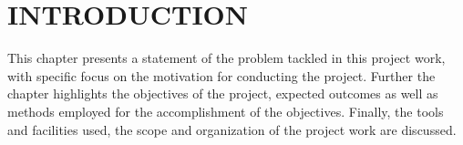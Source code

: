 

\chapter{INTRODUCTION}

\ifpdf
    \graphicspath{{1_introduction/figures/PNG/}{1_introduction/figures/PDF/}{1_introduction/figures/}}
\else
    \graphicspath{{1_introduction/figures/EPS/}{1_introduction/figures/}}
\fi




This chapter presents a statement of the problem tackled in this project work, with specific focus on the motivation for conducting the project. Further the chapter highlights the objectives of the project, expected outcomes as well as methods employed for the accomplishment of the objectives. Finally, the tools and facilities used, the scope and organization of the project work are discussed. 

